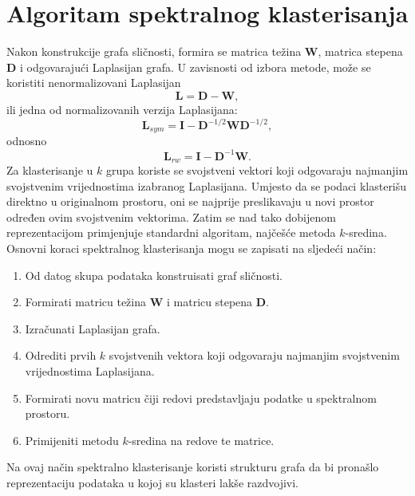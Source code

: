 \section{Algoritam spektralnog klasterisanja}
Nakon konstrukcije grafa sličnosti, formira se matrica težina \(\mathbf{W}\), matrica stepena \(\mathbf{D}\) i odgovarajući Laplasijan grafa. U zavisnosti od izbora metode, može se koristiti nenormalizovani Laplasijan
\[
    \mathbf{L} = \mathbf{D} - \mathbf{W},
\]
ili jedna od normalizovanih verzija Laplasijana:
\[
    \mathbf{L}_{sym}
    =
    \mathbf{I} - \mathbf{D}^{-1/2}\mathbf{W}\mathbf{D}^{-1/2},
\]
odnosno
\[
    \mathbf{L}_{rw}
    =
    \mathbf{I} - \mathbf{D}^{-1}\mathbf{W}.
\]
Za klasterisanje u \(k\) grupa koriste se svojstveni vektori koji odgovaraju najmanjim svojstvenim vrijednostima izabranog Laplasijana. Umjesto da se podaci klasterišu direktno u originalnom prostoru, oni se najprije preslikavaju u novi prostor određen ovim svojstvenim vektorima. Zatim se nad tako dobijenom reprezentacijom primjenjuje standardni algoritam, najčešće metoda \(k\)-sredina.
Osnovni koraci spektralnog klasterisanja mogu se zapisati na sljedeći način:
\begin{enumerate}
    \item Od datog skupa podataka konstruisati graf sličnosti.
    \item Formirati matricu težina \(\mathbf{W}\) i matricu stepena \(\mathbf{D}\).
    \item Izračunati Laplasijan grafa.
    \item Odrediti prvih \(k\) svojstvenih vektora koji odgovaraju najmanjim svojstvenim vrijednostima Laplasijana.
    \item Formirati novu matricu čiji redovi predstavljaju podatke u spektralnom prostoru.
    \item Primijeniti metodu \(k\)-sredina na redove te matrice.
\end{enumerate}
Na ovaj način spektralno klasterisanje koristi strukturu grafa da bi pronašlo reprezentaciju podataka u kojoj su klasteri lakše razdvojivi.

